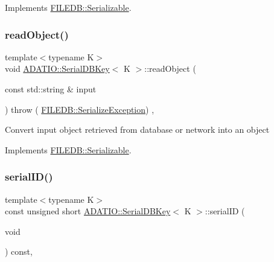 Implements \mbox{\hyperlink{classFILEDB_1_1Serializable_a21a5831fa4f65790490a8a5eba9fcab2}{F\+I\+L\+E\+D\+B\+::\+Serializable}}.

\mbox{\label{classADATIO_1_1SerialDBKey_a10b5c24f2529bac1df4c4603c2caf551}} 
\subsubsection{\texorpdfstring{readObject()}{readObject()}\hspace{0.1cm}{\footnotesize\ttfamily [3/3]}}
{\footnotesize\ttfamily template$<$typename K$>$ \\
void \mbox{\hyperlink{classADATIO_1_1SerialDBKey}{A\+D\+A\+T\+I\+O\+::\+Serial\+D\+B\+Key}}$<$ K $>$\+::read\+Object (\begin{DoxyParamCaption}\item[{const std\+::string \&}]{input }\end{DoxyParamCaption}) throw ( \mbox{\hyperlink{classFILEDB_1_1SerializeException}{F\+I\+L\+E\+D\+B\+::\+Serialize\+Exception}}) \hspace{0.3cm}{\ttfamily [inline]}, {\ttfamily [virtual]}}

Convert input object retrieved from database or network into an object 

Implements \mbox{\hyperlink{classFILEDB_1_1Serializable_a21a5831fa4f65790490a8a5eba9fcab2}{F\+I\+L\+E\+D\+B\+::\+Serializable}}.

\mbox{\label{classADATIO_1_1SerialDBKey_a0d088e08f453fd38a906208783f788d7}} 
\subsubsection{\texorpdfstring{serialID()}{serialID()}\hspace{0.1cm}{\footnotesize\ttfamily [1/3]}}
{\footnotesize\ttfamily template$<$typename K$>$ \\
const unsigned short \mbox{\hyperlink{classADATIO_1_1SerialDBKey}{A\+D\+A\+T\+I\+O\+::\+Serial\+D\+B\+Key}}$<$ K $>$\+::serial\+ID (\begin{DoxyParamCaption}\item[{void}]{ }\end{DoxyParamCaption}) const\hspace{0.3cm}{\ttfamily [inline]}, {\ttfamily [virtual]}}

